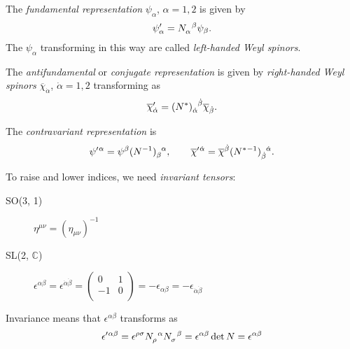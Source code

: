 \begin{definition}[fundamental]
  The \emph{fundamental representation} $\psi_{\alpha}$, $\alpha = 1, 2$ is given by
  \begin{equation}
    \psi'_{\alpha} = N\indices{_{\alpha}^{\beta}} \psi_{\beta}.
  \end{equation}
  The $\psi_{\alpha}$ transforming in this way are called \emph{left-handed Weyl spinors}.
\end{definition}
\begin{definition}[conjugate]
  The \emph{antifundamental} or \emph{conjugate representation} is given by \emph{right-handed Weyl spinors} $\overline{\chi}_{\dot{\alpha}}$, $\dot{\alpha} = 1, 2$ transforming as
  \begin{equation}
    \overline{\chi}{}'_{\dot{\alpha}} = (N^*)\indices{_{\dot{\alpha}}^{\dot{\beta}}} \overline{\chi}_{\dot{\beta}}.
  \end{equation}
\end{definition}
\begin{definition}[contravariant]
  The \emph{contravariant representation} is
  \begin{equation}
    \psi'{}^{\alpha} = \psi^{\beta} (N^{-1})\indices{_{\beta}^{\alpha}}, 
    \qquad \overline{\chi}{}'{}^{\dot{\alpha}} = \overline{\chi}{}^{\dot{\beta}} (N^*{}^{-1})\indices{_{\dot{\beta}}^{\dot{\alpha}}}.
  \end{equation}
\end{definition}

To raise and lower indices, we need \emph{invariant tensors}:
\begin{description}
  \item[SO(3, 1)] $\eta^{\mu\nu} = (\eta_{\mu\nu})^{-1}$
  \item[SL(2, $\mathbb{C}$)] $\epsilon^{\alpha\beta} = \epsilon^{\dot{\alpha} \dot{\beta}} = 
    \begin{pmatrix}
     0 & 1 \\
     -1 & 0 \\
    \end{pmatrix} = -\epsilon_{\alpha\beta} = -\epsilon_{\dot{\alpha} \dot{\beta}}$ 
\end{description}
Invariance means that $\epsilon^{\alpha\beta}$ transforms as
\begin{equation}
  \epsilon'{}^{\alpha\beta} = \epsilon^{\rho\sigma} N\indices{_{\rho}^{\alpha}} N\indices{_{\sigma}^{\beta}} = \epsilon^{\alpha\beta} \det N = \epsilon^{\alpha\beta}
\end{equation}
